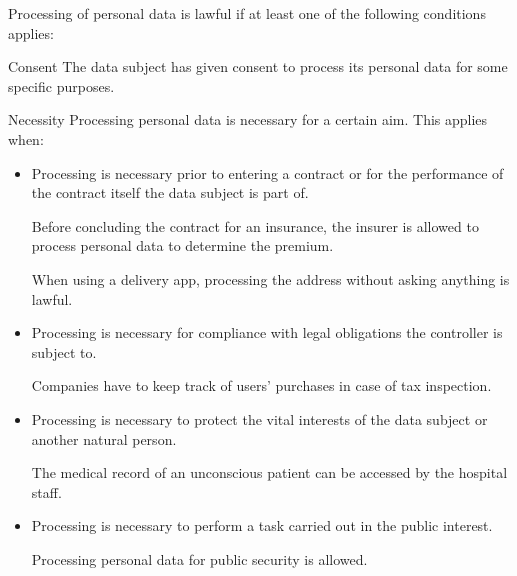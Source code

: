 Processing of personal data is lawful if at least one of the following conditions applies:
\begin{descriptionlist}
    \item[Consent] The data subject has given consent to process its personal data for some specific purposes.

    \item[Necessity]
        Processing personal data is necessary for a certain aim. This applies when:
        \begin{itemize}
            \item Processing is necessary prior to entering a contract or for the performance of the contract itself the data subject is part of.
            \begin{example}
                Before concluding the contract for an insurance, the insurer is allowed to process personal data to determine the premium.
            \end{example}
            \begin{example}
                When using a delivery app, processing the address without asking anything is lawful.
            \end{example}
            
            \item Processing is necessary for compliance with legal obligations the controller is subject to.
            \begin{example}
                Companies have to keep track of users' purchases in case of tax inspection.
            \end{example}
            
            \item Processing is necessary to protect the vital interests of the data subject or another natural person.
            \begin{example}
                The medical record of an unconscious patient can be accessed by the hospital staff.
            \end{example}
            
            \item Processing is necessary to perform a task carried out in the public interest.
            \begin{example}
                Processing personal data for public security is allowed.
            \end{example}
        \end{itemize}


\end{descriptionlist}
